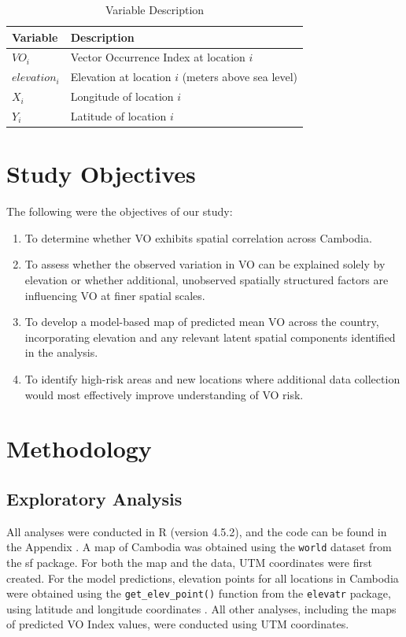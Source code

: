 \documentclass[12pt]{article}
\begin{document}
\begin{table}[htbp]
\centering
\caption{Variable Description}
\label{tab:vars}
\begin{tabular}{ll}
\hline
\textbf{Variable} & \textbf{Description} \\
\hline
$VO_i$        & Vector Occurrence Index at location $i$ \\
$elevation_i$ & Elevation at location $i$ (meters above sea level) \\
$X_i$         & Longitude of location $i$ \\
$Y_i$         & Latitude of location $i$ \\
\hline
\end{tabular}
\end{table}


\section{Study Objectives}
The following were the objectives of our study:
\begin{enumerate}
    \item To  determine whether VO exhibits spatial correlation across Cambodia. %
    \item To assess whether the observed variation in VO can be explained solely by elevation or whether additional, unobserved spatially structured factors are influencing VO at finer spatial scales.
    \item To develop a model-based map of predicted mean VO across the country, incorporating elevation and any relevant latent spatial components identified in the analysis.
    \item  To identify high-risk areas and new locations where additional data collection would most effectively improve understanding of VO risk.
\end{enumerate}

\section{Methodology}
\subsection{Exploratory Analysis}
All analyses were conducted in R (version 4.5.2), and the code can be found in the Appendix \cite{r_cite}. A map of Cambodia was obtained using the \texttt{world} dataset from the sf package\cite{sf_book}\cite{sf_package}. For both the map and the data, UTM coordinates were first created. For the model predictions, elevation points for all locations in Cambodia were obtained using the \texttt{get\_elev\_point()} function from the \texttt{elevatr} package, using latitude and longitude coordinates \cite{elev}. All other analyses, including the maps of predicted VO Index values, were conducted using UTM coordinates. \\
\end{document}
